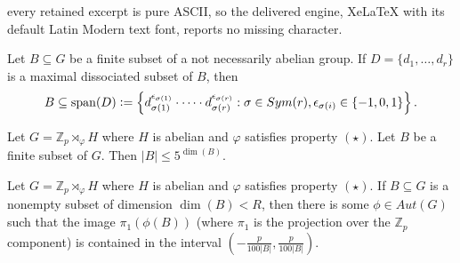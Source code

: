 \documentclass[10pt,a4paper]{amsart}
\DeclareMathOperator{\Span}{span}
\begin{document}
every retained excerpt is pure ASCII, so the delivered engine, XeLaTeX with its default Latin Modern text font, reports no missing character.
\begin{lemma}\label{lem:dissociated-set-generator}
Let $B \subseteq G$ be a finite subset of a not necessarily abelian group.  If $D=\{d_1, \ldots, d_r\}$ is a maximal dissociated subset of $B$, then
$$B \subseteq \Span(D) \vcentcolon= \left\{d_{\sigma(1)}^{\epsilon_{\sigma(1)}} \cdot \cdots \cdot d_{\sigma(r)}^ {\epsilon_{\sigma(r)}}: \sigma \in Sym(r), \epsilon_{\sigma(i)}\in\{-1,0,1\}\right\}.$$
\end{lemma}

\begin{lemma}\label{lem:dimension-cardinality2}
Let $G=\mathbb{Z}_{p} \rtimes_{\varphi} H$ where $H$ is abelian and $\varphi$ satisfies property $(\star)$. Let $B$ be a finite subset of $G$. Then
$|B| \leq 5^{\dim(B)}$.
\end{lemma}

\begin{lemma}\label{lem:small-dim-recitification}

Let $G=\mathbb{Z}_{p} \rtimes_{\varphi} H$ where $H$ is abelian and $\varphi$ satisfies property $(\star)$. If $B \subseteq G$ is a nonempty subset of dimension $\dim(B)< R$, then there is some $\phi \in Aut(G)$ such that the image $\pi_1(\phi(B))$ (where $\pi_1$ is the projection over the $\mathbb{Z}_p$ component) is contained in the interval $(-\frac{p}{100|B|},\frac{p}{100|B|})$.
\end{lemma}
\end{document}
